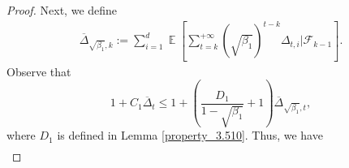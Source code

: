 \documentclass{article} %
\DeclareMathOperator{\Expect}{\mathbb{E}}
\begin{document}
\begin{proof}
Next, we define
\begin{align*}
    \overline{\Delta}_{\sqrt{\beta_{1}},k} := \sum_{i=1}^{d}\Expect\left[\sum_{t=k}^{+\infty} (\sqrt{\beta_{1}})^{t-k} \Delta_{t,i}\bigg|\mathscr{F}_{k-1}\right].
\end{align*}
Observe that
\[1 + C_{1} \overline{\Delta}_{t} \leq 1 + \left(\frac{D_1}{1 - \sqrt{\beta_{1}}} + 1\right) \overline{\Delta}_{\sqrt{\beta_{1}},t},\]
where \(D_{1}\) is defined in Lemma \ref{property_3.510}. Thus, we have
\begin{align*}

\end{align*}
\end{proof}
\end{document}
